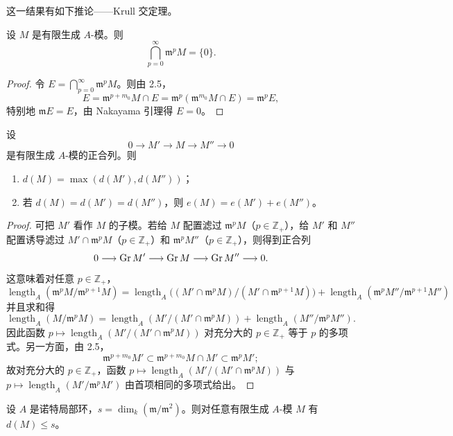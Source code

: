 这一结果有如下推论——Krull 交定理。

\begin{theorem}[Krull]
设 $M$ 是有限生成 $A$-模。则
$$\bigcap_{p=0}^{\infty}\mathfrak{m}^p M=\{0\}.$$
\end{theorem}

\begin{proof}
令 $E=\bigcap_{p=0}^{\infty}\mathfrak{m}^p M$。则由 2.5，
$$E=\mathfrak{m}^{p+m_0}M\cap E=\mathfrak{m}^p(\mathfrak{m}^{m_0}M\cap E)=\mathfrak{m}^p E,$$
特别地 $\mathfrak{m}E=E$，由 Nakayama 引理得 $E=0$。
\end{proof}

\begin{lemma}
设
$$0\longrightarrow M'\longrightarrow M\longrightarrow M''\longrightarrow 0$$
是有限生成 $A$-模的正合列。则
\begin{enumerate}[label=(\roman*)]
  \item $d(M)=\max(d(M'),d(M''))$；
  \item 若 $d(M)=d(M')=d(M'')$，则 $e(M)=e(M')+e(M'')$。
\end{enumerate}
\end{lemma}

\begin{proof}
可把 $M'$ 看作 $M$ 的子模。若给 $M$ 配置滤过 $\mathfrak{m}^p M$（$p\in\mathbb{Z}_+$），给 $M'$ 和 $M''$ 配置诱导滤过 $M'\cap\mathfrak{m}^p M$（$p\in\mathbb{Z}_+$）和 $\mathfrak{m}^p M''$（$p\in\mathbb{Z}_+$），则得到正合列
$$0\longrightarrow \operatorname{Gr} M'\longrightarrow \operatorname{Gr} M\longrightarrow \operatorname{Gr} M''\longrightarrow 0.$$
这意味着对任意 $p\in\mathbb{Z}_+$，
$$\operatorname{length}_A(\mathfrak{m}^p M/\mathfrak{m}^{p+1}M)
=\operatorname{length}_A\bigl((M'\cap\mathfrak{m}^p M)/(M'\cap\mathfrak{m}^{p+1}M)\bigr)+\operatorname{length}_A(\mathfrak{m}^p M''/\mathfrak{m}^{p+1}M'')$$
并且求和得
$$\operatorname{length}_A(M/\mathfrak{m}^p M)=\operatorname{length}_A(M'/(M'\cap\mathfrak{m}^p M))+\operatorname{length}_A(M''/\mathfrak{m}^p M'').$$
因此函数 $p\longmapsto \operatorname{length}_A(M'/(M'\cap\mathfrak{m}^p M))$ 对充分大的 $p\in\mathbb{Z}_+$ 等于 $p$ 的多项式。另一方面，由 2.5，
$$\mathfrak{m}^{p+m_0}M'\subset \mathfrak{m}^{p+m_0}M\cap M'\subset \mathfrak{m}^p M';$$
故对充分大的 $p\in\mathbb{Z}_+$，函数 $p\longmapsto \operatorname{length}_A(M'/(M'\cap\mathfrak{m}^p M))$ 与 $p\longmapsto \operatorname{length}_A(M'/\mathfrak{m}^p M')$ 由首项相同的多项式给出。
\end{proof}

\begin{corollary}
设 $A$ 是诺特局部环，$s=\dim_k(\mathfrak{m}/\mathfrak{m}^2)$。则对任意有限生成 $A$-模 $M$ 有 $d(M)\le s$。
\end{corollary}

